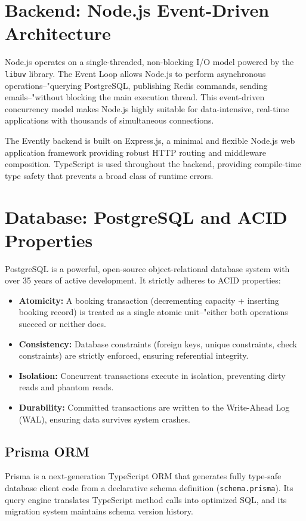 \documentclass[12pt,a4paper]{report}
\begin{document}
\section{Backend: Node.js Event-Driven Architecture}
Node.js operates on a single-threaded, non-blocking I/O model powered by the \texttt{libuv} library. The Event Loop allows Node.js to perform asynchronous operations--"querying PostgreSQL, publishing Redis commands, sending emails--"without blocking the main execution thread. This event-driven concurrency model makes Node.js highly suitable for data-intensive, real-time applications with thousands of simultaneous connections.

The Evently backend is built on Express.js, a minimal and flexible Node.js web application framework providing robust HTTP routing and middleware composition. TypeScript is used throughout the backend, providing compile-time type safety that prevents a broad class of runtime errors.

\section{Database: PostgreSQL and ACID Properties}
PostgreSQL is a powerful, open-source object-relational database system with over 35 years of active development. It strictly adheres to ACID properties:
\begin{itemize}[leftmargin=2em]
    \item \textbf{Atomicity:} A booking transaction (decrementing capacity + inserting booking record) is treated as a single atomic unit--"either both operations succeed or neither does.
    \item \textbf{Consistency:} Database constraints (foreign keys, unique constraints, check constraints) are strictly enforced, ensuring referential integrity.
    \item \textbf{Isolation:} Concurrent transactions execute in isolation, preventing dirty reads and phantom reads.
    \item \textbf{Durability:} Committed transactions are written to the Write-Ahead Log (WAL), ensuring data survives system crashes.
\end{itemize}

\subsection{Prisma ORM}
Prisma is a next-generation TypeScript ORM that generates fully type-safe database client code from a declarative schema definition (\texttt{schema.prisma}). Its query engine translates TypeScript method calls into optimized SQL, and its migration system maintains schema version history.
\end{document}
